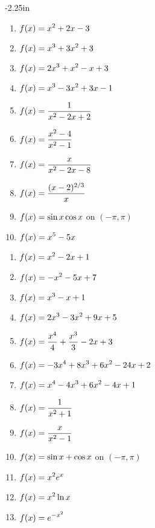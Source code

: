 \begin{adjustwidth*}{}{-2.25in}
\begin{multicols*}{2}
\begin{enumerate}[1),resume]
\item $\displaystyle f(x) =x^2+2x-3$
	
\item $\displaystyle f(x) =x^3+3x^2+3$
	
\item $\displaystyle f(x) =2 x^3+x^2-x+3$

\item $\displaystyle f(x) =x^3-3x^2+3x-1$

\item $\displaystyle f(x) =\frac{1}{x^2-2x+2}$

\item $\displaystyle f(x) =\frac{x^2-4}{x^2-1}$

\item $\displaystyle f(x) =\frac{x}{x^2-2x-8}$

\item $\displaystyle f(x) =\frac{(x-2)^{2/3}}{x}$

\item $\displaystyle f(x) =\sin x\cos x$ on $(-\pi,\pi)$

\item $\displaystyle f(x) =x^5-5x$
\end{enumerate}


\begin{enumerate}[1),resume]
\item $\displaystyle f(x) = x^2-2x+1$ \label{exer:03_04_ex_16}
\item $\displaystyle f(x) = -x^2-5x+7$
\item $\displaystyle f(x) = x^3-x+1$
\item $\displaystyle f(x) = 2x^3-3x^2+9x+5$
\item $\displaystyle f(x) = \frac{x^4}{4}+\frac{x^3}{3}-2 x+3$
\item $\displaystyle f(x) = -3 x^4+8 x^3+6 x^2-24 x+2$
\item $\displaystyle f(x) = x^4-4x^3+6x^2-4x+1$
\item $\displaystyle f(x) = \frac{1}{x^2+1}$
\item $\displaystyle f(x) = \frac{x}{x^2-1}$
\item $\displaystyle f(x) = \sin x + \cos x$ on $(-\pi,\pi)$
\item $\displaystyle f(x) = x^2e^x$
\item $\displaystyle f(x) = x^2\ln x$
\item $\displaystyle f(x) = e^{-x^2}$\label{exer:03_04_ex_28}
\end{enumerate}


\end{multicols*}
\end{adjustwidth*}
